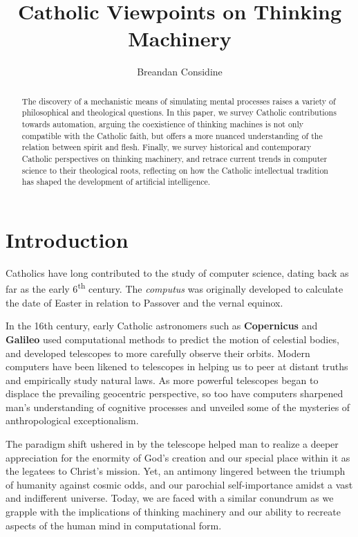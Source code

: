 \documentclass[sigplan,nonacm]{acmart}\settopmatter{printfolios=false,printccs=false,printacmref=false}
\begin{document}
  \title{Catholic Viewpoints on Thinking Machinery}
  \begin{abstract}
  The discovery of a mechanistic means of simulating mental processes raises a variety of philosophical and theological questions. In this paper, we survey Catholic contributions towards automation, arguing the coexistience of thinking machines is not only compatible with the Catholic faith, but offers a more nuanced understanding of the relation between spirit and flesh. Finally, we survey historical and contemporary Catholic perspectives on thinking machinery, and retrace current trends in computer science to their theological roots, reflecting on how the Catholic intellectual tradition has shaped the development of artificial intelligence.
  \end{abstract}

  \author{Breandan Considine}

  \maketitle

  \section{Introduction}

  Catholics have long contributed to the study of computer science, dating back as far as the early 6\textsuperscript{th} century. The \textit{computus} was originally developed to calculate the date of Easter in relation to Passover and the vernal equinox.

  In the 16th century, early Catholic astronomers such as \textbf{Copernicus} and \textbf{Galileo} used computational methods to predict the motion of celestial bodies, and developed telescopes to more carefully observe their orbits. Modern computers have been likened to telescopes in helping us to peer at distant truths and empirically study natural laws. As more powerful telescopes began to displace the prevailing geocentric perspective, so too have computers sharpened man's understanding of cognitive processes and unveiled some of the mysteries of anthropological exceptionalism.

  The paradigm shift ushered in by the telescope helped man to realize a deeper appreciation for the enormity of God's creation and our special place within it as the legatees to Christ's mission. Yet, an antimony lingered between the triumph of humanity against cosmic odds, and our parochial self-importance amidst a vast and indifferent universe. Today, we are faced with a similar conundrum as we grapple with the implications of thinking machinery and our ability to recreate aspects of the human mind in computational form.
\end{document}

